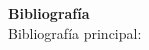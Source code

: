 \documentclass[letterpaper,10pt,onecolumn]{article}
\begin{document}






\vspace*{0.5cm} 

\noindent\textbf{\large {} \quad
  Bibliograf\'ia}\\[-0.2cm] 



\noindent\normalsize Bibliograf\'ia principal:
\end{document}
